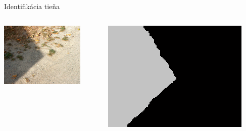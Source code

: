 \documentclass[red]{beamer}
\begin{document}
\begin{frame}{Identifikácia tieňa}
\pause
{}
\pause
{}
\pause
\bigskip
\begin{columns}
\begin{column}{.49\linewidth}
\centerline{\includegraphics[width=\linewidth]{./img/example}}
\end{column}
\begin{column}{.49\linewidth}
\centerline{\includegraphics[width=\linewidth]{./img/mask}}
\end{column}
\end{columns}
\end{frame}
\end{document}
